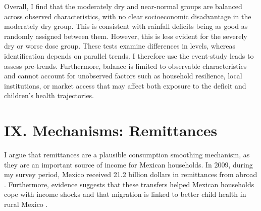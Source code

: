 Overall, I find that the moderately dry and near-normal groups are balanced across observed characteristics, with no clear socioeconomic disadvantage in the moderately dry group. This is consistent with rainfall deficits being as good as randomly assigned between them. However, this is less evident for the severely dry or worse dose group. These tests examine differences in levels, whereas identification depends on parallel trends. I therefore use the event-study leads to assess pre-trends. Furthermore, balance is limited to observable characteristics and cannot account for unobserved factors such as household resilience, local institutions, or market access that may affect both exposure to the deficit and children's health trajectories.

\section*{IX. Mechanisms: Remittances}\label{sec:IX}

I argue that remittances are a plausible consumption smoothing mechanism, as they are an important source of income for Mexican households. In 2009, during my survey period, Mexico received 21.2 billion dollars in remittances from abroad \parencite{ordazdiazMigracionRemesas2011}. Furthermore, evidence suggests that these transfers helped Mexican households cope with income shocks \parencite{amuedo-dorantesRemittancesIncomeSmoothing2011} and that migration is linked to better child health in rural Mexico \parencite{hildebrandtEffectsMigrationChild2005}.

